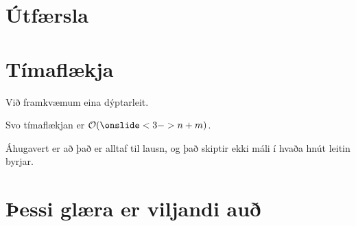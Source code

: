 \section{Útfærsla}
{
	\only<1> {  }
	\only<2> {  }
}

\section{Tímaflækja}
{
	{
		\item<1-> Við framkvæmum eina dýptarleit.
		\item<2-> Svo tímaflækjan er $\mathcal{O}(\onslide<3->{n + m})$.
		\item<4-> Áhugavert er að það er alltaf til lausn, og það skiptir ekki máli í hvaða hnút leitin byrjar.
	}
}

\section{Þessi glæra er viljandi auð}
{
}



